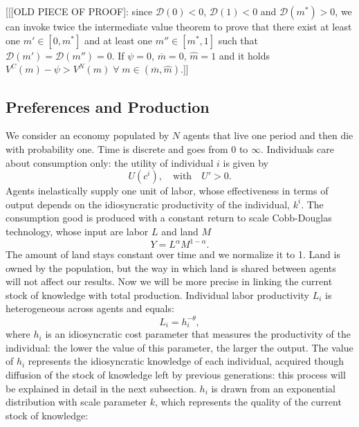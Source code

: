 \FloatBarrier


[[[OLD PIECE OF PROOF]: since $\mathcal{D}(0)<0$, $\mathcal{D}(1)<0$ and $\mathcal{D}(m^*)>0$, we can invoke twice the intermediate value theorem to prove that there exist at least one $m'\in[0,m^*]$ and at least one $m''\in[m^*,1]$ such that $\mathcal{D}(m')=\mathcal{D}(m'')=0$.
If $\psi=0$, $\overline{m}=0$, $\hat{m}=1$ and it holds $V^C(m)-\psi>V^N(m)\;\forall\;m\in(\overline{m},\hat{m})$.]]
\subsection{Preferences and Production}
We consider an economy populated by $N$ agents that live one period and then die with probability one. Time is discrete and goes from $0$ to $\infty$. Individuals care about consumption only: the utility of individual $i$ is given by
\begin{equation}
U(c^i), \quad \text{with} \quad U'>0.
\end{equation}
Agents inelastically supply one unit of labor, whose effectiveness in terms of output depends on the idiosyncratic productivity of the individual, $k^i$.
The consumption good is produced with a constant return to scale Cobb-Douglas technology, whose input are labor $L$ and land $M$
\begin{equation}
Y=L^\alpha M^{1-\alpha}.
\end{equation}
The amount of land stays constant over time and we normalize it to 1. Land is owned by the population, but the way in which land is shared between agents will not affect our results. Now we will be more precise in linking the current stock of knowledge with total production. Individual labor productivity $L_i$ is heterogeneous across agents and equals:
\begin{equation}\label{eq:indout}
L_i=h_i^{-\theta},
\end{equation}
where $h_i$ is an idiosyncratic cost parameter that measures the productivity of the individual: the lower the value of this parameter, the larger the output. The value of $h_i$ represents the idiosyncratic knowledge of each individual, acquired though diffusion of the stock of knowledge left by previous generations: this process will be explained in detail in the next subsection. $h_i$ is drawn from an exponential distribution with scale parameter $k$, which represents the quality of the current stock of knowledge:
